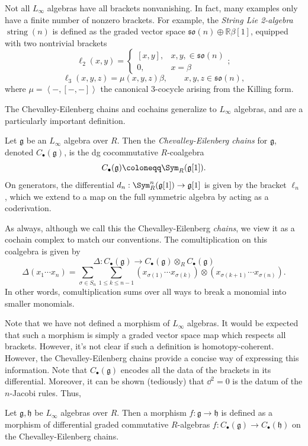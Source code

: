 Not all $L_\infty $ algebras have all brackets nonvanishing. In fact, many examples only have a finite number of nonzero brackets. For example, the \emph{String Lie 2-algebra} $\operatorname{string} (n)$ is defined as the graded vector space $\mathfrak{so} (n)\oplus \mathbb{R} \beta [1]$, equipped with two nontrivial brackets
\[
	\ell _2(x,y) = 
	\begin{cases}
		[x,y],&x,y,\in \mathfrak{so} (n)\\
		0,& x=\beta 
	\end{cases}
;\]
\[
	\ell _3(x,y,z) =\mu (x,y,z)\beta ,\qquad x,y,z\in \mathfrak{so} (n),
\]
where $\mu =\left\langle -,[-,-] \right\rangle $ the canonical 3-cocycle arising from the Killing form.

The Chevalley-Eilenberg chains and cochains generalize to $L_\infty $ algebras, and are a particularly important definition.

\begin{definition}\label{dfn:10-1-2}
	Let $\mathfrak{g} $ be an $L_\infty $ algebra over $R$. Then the \emph{Chevalley-Eilenberg chains} for $\mathfrak{g} $, denoted $C_{\bullet} (\mathfrak{g} )$, is the dg cocommutative $R$-coalgebra
	\[
		C_{\bullet} (\mathfrak{g} )\coloneqq \Sym_R(\mathfrak{g} [1])
	.\]
	On generators, the differential $d_n : \Sym ^n_R(\mathfrak{g} [1]) \to \mathfrak{g} [1]$ is given by the bracket $\ell _n$, which we extend to a map on the full symmetric algebra by acting as a coderivation.
\end{definition}

As always, although we call this the Chevalley-Eilenberg \emph{chains}, we view it as a cochain complex to match our conventions. The comultiplication on this coalgebra is given by
\[
	\Delta : C_{\bullet} (\mathfrak{g} ) \to C_{\bullet} (\mathfrak{g} )\otimes_R C_{\bullet} (\mathfrak{g} )
\]
\[
	\Delta (x_1\cdots x_n) = \sum_{\sigma \in S_n} \sum_{1\leq k\leq n-1} (x_{\sigma (1)} \cdots x_{\sigma (k)} )\otimes (x_{\sigma (k+1)}\cdots x_{\sigma (n)} )
.\]
In other words, comultiplication sums over all ways to break a monomial into smaller monomials.

Note that we have not defined a morphism of $L_\infty $ algebras. It would be expected that such a morphism is simply a graded vector space map which respects all brackets. However, it's not clear if such a definition is homotopy-coherent. However, the Chevalley-Eilenberg chains provide a concise way of expressing this information. Note that $C_{\bullet} (\mathfrak{g} )$ encodes all the data of the brackets in its differential. Moreover, it can be shown (tediously) that $\dd ^2=0$ is the datum of the $n$-Jacobi rules. Thus,
\begin{definition}\label{dfn:10-1-3}
	Let $\mathfrak{g} ,\mathfrak{h} $ be $L_\infty $ algebras over $R$. Then a morphism $f : \mathfrak{g}  \to \mathfrak{h} $ is defined as a morphism of differential graded commutative $R$-algebras $f : C_{\bullet} (\mathfrak{g} ) \to C_{\bullet} (\mathfrak{h} )$ on the Chevalley-Eilenberg chains. 
\end{definition}

